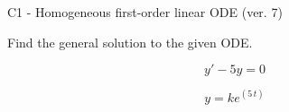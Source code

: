 \begin{exercise}
  \begin{exerciseTitle}C1 - Homogeneous first-order linear ODE (ver. 7)\end{exerciseTitle}
  \begin{exerciseStatement}
    
Find the general solution to the given ODE.

    
\[y'-5y=0\]

  \end{exerciseStatement}
  \begin{exerciseAnswer}
    
\[y= k e^{\left(5 \, t\right)}\]

  \end{exerciseAnswer}
\end{exercise}